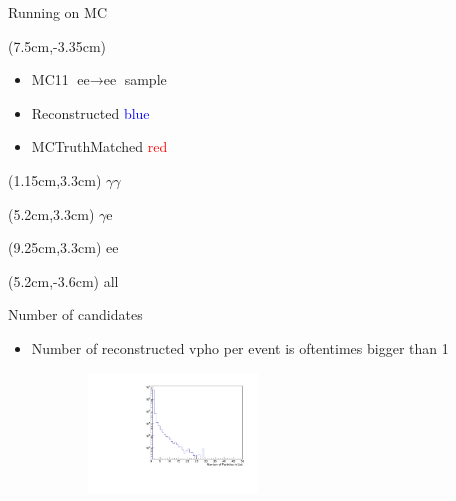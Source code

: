 \documentclass[10pt]{beamer}
\begin{document}
{\begin{frame}{Running on MC}
\begin{textblock*}{\textwidth}
\end{textblock*}	

\begin{textblock*}{\textwidth}(7.5cm,-3.35cm)
	\begin{itemize}
		\item MC11 $\textrm{ee} \rightarrow \textrm{ee}$ sample
		\item Reconstructed \textcolor{blue}{blue}
		\item MCTruthMatched \textcolor{red}{red}
	\end{itemize}
	
\end{textblock*}

\begin{textblock*}{\textwidth}(1.15cm,3.3cm)
 $\gamma \gamma$
\end{textblock*}

\begin{textblock*}{\textwidth}(5.2cm,3.3cm)
	$\gamma \textrm{e}$
\end{textblock*}

\begin{textblock*}{\textwidth}(9.25cm,3.3cm)
	$\textrm{ee}$
\end{textblock*}


\begin{textblock*}{\textwidth}(5.2cm,-3.6cm)
	all
\end{textblock*}


\end{frame}


\begin{frame}{Number of candidates}
	
	\begin{itemize}
		\item Number of reconstructed vpho per event is oftentimes bigger than 1
	\end{itemize}
	
	
	
		\begin{figure}
		\begin{subfigure}{.5\textwidth}
			\centering
			\includegraphics[width=4.5cm]{Plots/NumVpho}
			

\end{subfigure}
\end{figure}
\end{frame}}
\end{document}
